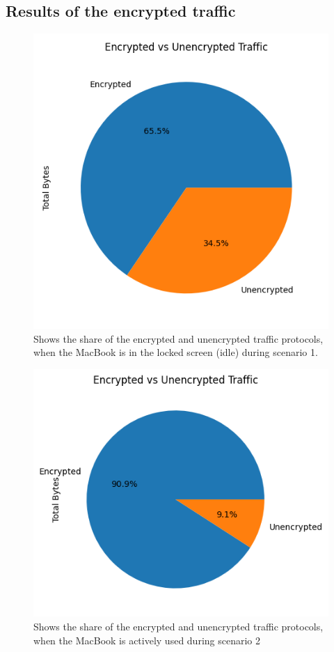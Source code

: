 \documentclass[sigconf,nonacm]{acmart}
\begin{document}
\subsection{Results of the encrypted traffic}
\label{sec:part2_encrypted_traffic}
\begin{figure}[htbp]
    \centering
    \includegraphics[width=\columnwidth]{images/part2/idle/encrypted_vs_unencrypted.png}
    \caption{Shows the share of the encrypted and unencrypted traffic protocols, when the MacBook is in the locked screen (idle) during scenario 1.}
    \label{fig:encryption_idle}
\end{figure}
\begin{figure}[htbp]
    \centering
    \includegraphics[width=\columnwidth]{images/part2/active use/encrypted_traffic.png}
    \caption{Shows the share of the encrypted and unencrypted traffic protocols, when the MacBook is actively used during scenario 2}
    \label{fig:encryption_active}
\end{figure}
\end{document}
